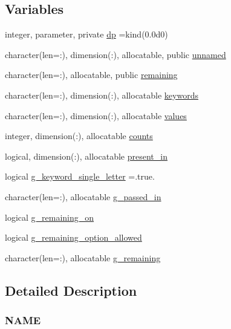 \subsection*{Variables}
\begin{DoxyCompactItemize}
\item 
integer, parameter, private \mbox{\hyperlink{namespacem__cli2_acf83f1963cf6a56ad0221cfcf5402440}{dp}} =kind(0.\+0d0)
\item 
character(len=\+:), dimension(\+:), allocatable, public \mbox{\hyperlink{namespacem__cli2_a5b03781cb432174f4ee8d734ecbb9604}{unnamed}}
\item 
character(len=\+:), allocatable, public \mbox{\hyperlink{namespacem__cli2_ae158de0b5e1d1a55bb297ed576e38273}{remaining}}
\item 
character(len=\+:), dimension(\+:), allocatable \mbox{\hyperlink{namespacem__cli2_a314f3903115db4ab9e2ec03b540aec76}{keywords}}
\item 
character(len=\+:), dimension(\+:), allocatable \mbox{\hyperlink{namespacem__cli2_af631ee3a1bca98e9fbf1f80646dae360}{values}}
\item 
integer, dimension(\+:), allocatable \mbox{\hyperlink{namespacem__cli2_abf81746a55c2218c7f2de15602bc0be8}{counts}}
\item 
logical, dimension(\+:), allocatable \mbox{\hyperlink{namespacem__cli2_adf9ffb8a34d1bd666fa91ed953bcb9f4}{present\+\_\+in}}
\item 
logical \mbox{\hyperlink{namespacem__cli2_ad1fe6713ae917008c41792b9cad267b7}{g\+\_\+keyword\+\_\+single\+\_\+letter}} =.true.
\item 
character(len=\+:), allocatable \mbox{\hyperlink{namespacem__cli2_a1945bae73d2d148bb01a15d89acd07cd}{g\+\_\+passed\+\_\+in}}
\item 
logical \mbox{\hyperlink{namespacem__cli2_a81306eb55af0b7b6ab8aa2851c0bd8be}{g\+\_\+remaining\+\_\+on}}
\item 
logical \mbox{\hyperlink{namespacem__cli2_af16d24ebf98bf90f8c7c32dda70eeb43}{g\+\_\+remaining\+\_\+option\+\_\+allowed}}
\item 
character(len=\+:), allocatable \mbox{\hyperlink{namespacem__cli2_a9ff84c9aa401e7b45d9d86cd6b17bbcc}{g\+\_\+remaining}}
\end{DoxyCompactItemize}


\subsection{Detailed Description}
\subsubsection*{N\+A\+ME}

